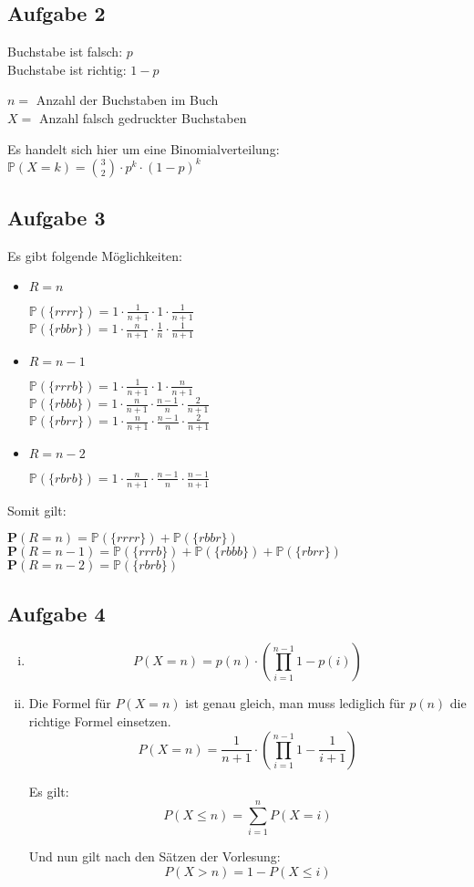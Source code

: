 \documentclass[10pt,a4paper,parskip=half]{scrartcl}
\begin{document}
\subsection*{Aufgabe 2}
Buchstabe ist falsch: $p$\\
Buchstabe ist richtig: $1-p$

$n = $ Anzahl der Buchstaben im Buch\\
$X = $ Anzahl falsch gedruckter Buchstaben

Es handelt sich hier um eine Binomialverteilung: \\
$\mathbb P (X = k) = {3 \choose 2} \cdot p^k \cdot (1-p)^k$

\subsection*{Aufgabe 3}
Es gibt folgende Möglichkeiten:

\begin{itemize}
\item $R=n$

$\mathbb P (\{rrrr\}) = 1 \cdot\frac 1 {n+1} \cdot 1 \cdot \frac 1 {n+1}$\\
$\mathbb P (\{rbbr\}) = 1 \cdot\frac n {n+1} \cdot \frac {1} n \cdot \frac 1 {n+1}$\\
\item $R=n-1$

$\mathbb P (\{rrrb\}) = 1 \cdot\frac 1 {n+1} \cdot 1 \cdot \frac n {n+1}$\\
$\mathbb P (\{rbbb\}) = 1 \cdot\frac n {n+1} \cdot \frac {n-1} n \cdot \frac 2 {n+1}$\\
$\mathbb P (\{rbrr\}) = 1 \cdot\frac n {n+1} \cdot \frac {n-1} n \cdot \frac 2 {n+1}$\\
\item $R=n-2$

$\mathbb P (\{rbrb\}) = 1 \cdot\frac n {n+1} \cdot \frac {n-1} n \cdot \frac {n-1} {n+1}$\\
\end{itemize}

Somit gilt:

$\mathbf P(R=n) = \mathbb P (\{rrrr\}) + \mathbb P (\{rbbr\})$\\
$\mathbf P(R=n-1) = \mathbb P (\{rrrb\}) + \mathbb P (\{rbbb\}) + \mathbb P (\{rbrr\})$\\
$\mathbf P(R=n-2) = \mathbb P (\{rbrb\})$

\subsection*{Aufgabe 4}
\begin{enumerate}[(i)]
\item $$P(X = n) = p(n) \cdot \left(\prod_{i=1}^{n-1} 1-p(i)\right)$$
\item Die Formel für $P(X=n)$ ist genau gleich, man muss lediglich für $p(n)$ die richtige Formel einsetzen.
$$P(X = n) = \frac 1 {n+1} \cdot \left(\prod_{i=1}^{n-1} 1-\frac 1 {i+1}\right)$$

Es gilt:
$$P(X \le n) = \sum_{i=1}^{n} P(X = i)$$

Und nun gilt nach den Sätzen der Vorlesung:
$$P(X > n) = 1 - P(X \le i)$$


\end{enumerate}
\end{document}

